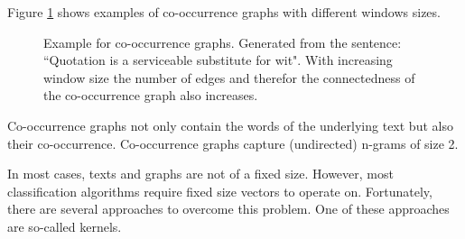 Figure \ref{fig:cooccurrence_graphs} shows examples of co-occurrence graphs with different windows sizes.

\begin{figure}[ht]%
    \centering
    \caption{Example for co-occurrence graphs. Generated from the sentence: ``Quotation is a serviceable substitute for wit". With increasing window size the number of edges and therefor the connectedness of the co-occurrence graph also increases.}%
    \label{fig:cooccurrence_graphs}%
\end{figure}

Co-occurrence graphs not only contain the words of the underlying text but also their co-occurrence.
Co-occurrence graphs capture (undirected) n-grams of size 2.

In most cases, texts and graphs are not of a fixed size.
However, most classification algorithms require fixed size vectors to operate on.
Fortunately, there are several approaches to overcome this problem.
One of these approaches are so-called kernels.

